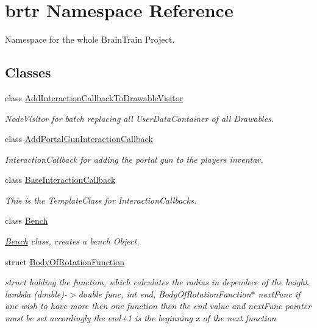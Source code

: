 \hypertarget{namespacebrtr}{\section{brtr Namespace Reference}
\label{namespacebrtr}
}


Namespace for the whole Brain\+Train Project.  


\subsection*{Classes}
\begin{DoxyCompactItemize}
\item 
class \hyperlink{classbrtr_1_1_add_interaction_callback_to_drawable_visitor}{Add\+Interaction\+Callback\+To\+Drawable\+Visitor}
\begin{DoxyCompactList}\small\item\em Node\+Visitor for batch replacing all User\+Data\+Container of all Drawables. \end{DoxyCompactList}\item 
class \hyperlink{classbrtr_1_1_add_portal_gun_interaction_callback}{Add\+Portal\+Gun\+Interaction\+Callback}
\begin{DoxyCompactList}\small\item\em Interaction\+Callback for adding the portal gun to the players inventar. \end{DoxyCompactList}\item 
class \hyperlink{classbrtr_1_1_base_interaction_callback}{Base\+Interaction\+Callback}
\begin{DoxyCompactList}\small\item\em This is the Template\+Class for Interaction\+Callbacks. \end{DoxyCompactList}\item 
class \hyperlink{classbrtr_1_1_bench}{Bench}
\begin{DoxyCompactList}\small\item\em \hyperlink{classbrtr_1_1_bench}{Bench} class, creates a bench Object. \end{DoxyCompactList}\item 
struct \hyperlink{structbrtr_1_1_body_of_rotation_function}{Body\+Of\+Rotation\+Function}
\begin{DoxyCompactList}\small\item\em struct holding the function, which calculates the radius in dependece of the height. lambda (double)-\/$>$double func, int end, Body\+Of\+Rotation\+Function$\ast$ next\+Func if one wish to have more then one function then the end value and next\+Func pointer must be set accordingly the end+1 is the beginning x of the next function \end{DoxyCompactList}\item 

\end{DoxyCompactItemize}
